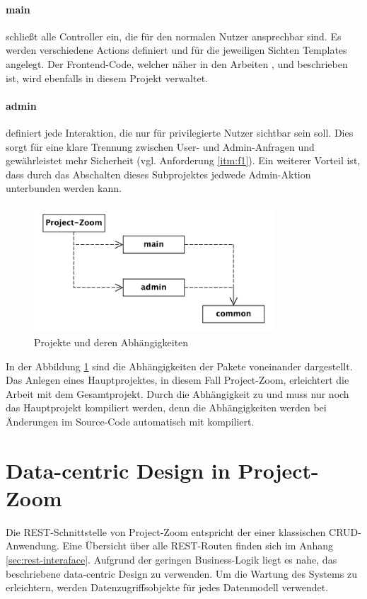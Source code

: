 \paragraph{main} schließt alle Controller ein, die für den normalen Nutzer ansprechbar sind. Es werden verschiedene Actions definiert und für die jeweiligen Sichten Templates angelegt. Der Frontend-Code, welcher näher in den Arbeiten \cite{bp-norman}, \cite{bp-tomh} und \cite{bp-anita} beschrieben ist, wird ebenfalls in diesem Projekt verwaltet.

\paragraph{admin} definiert jede Interaktion, die nur 
für privilegierte Nutzer sichtbar sein soll. Dies sorgt für eine klare Trennung zwischen User- und Admin-Anfragen und gewährleistet mehr Sicherheit (vgl. Anforderung \ref{itm:f1}). Ein weiterer Vorteil ist, dass durch das Abschalten dieses Subprojektes jedwede Admin-Aktion unterbunden werden kann.

\begin{figure}[h]  
  \centering     
  \includegraphics[width=0.8\textwidth]{img/projekte.pdf}  
   \caption{Projekte und deren Abhängigkeiten}   
  \label{fig:projects} 
\end{figure}

\FloatBarrier
In der Abbildung \ref{fig:projects} sind die Abhängigkeiten der Pakete voneinander dargestellt. Das Anlegen eines Hauptprojektes, in diesem Fall Project-Zoom, erleichtert die Arbeit mit dem Gesamtprojekt. Durch die Abhängigkeit zu  und  muss nur noch das Hauptprojekt kompiliert werden, denn die Abhängigkeiten werden bei Änderungen im Source-Code automatisch mit kompiliert.

\section{Data-centric Design in Project-Zoom}
\label{sec:umsetzung_dcd}
Die REST-Schnittstelle von Project-Zoom entspricht der einer klassischen CRUD-Anwendung. Eine Übersicht über alle REST-Routen finden sich im Anhang \ref{sec:rest-interaface}. Aufgrund der geringen Business-Logik liegt es nahe, das beschriebene data-centric Design zu verwenden. Um die Wartung des Systems zu erleichtern, werden Datenzugriffsobjekte für jedes Datenmodell verwendet.
\\\\\\ %


